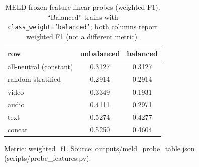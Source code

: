 \begin{table}[t]
\centering
\caption{MELD frozen-feature linear probes (weighted F1). ``Balanced'' trains with \texttt{class\_weight=`balanced'}; both columns report weighted F1 (not a different metric).}
\label{tab:meld-probe}
\begin{tabular}{lcc}
\toprule
row & unbalanced & balanced \\
\midrule
all-neutral (constant) & 0.3127 & 0.3127 \\
random-stratified & 0.2914 & 0.2914 \\
video & 0.3349 & 0.1931 \\
audio & 0.4111 & 0.2971 \\
text & 0.5274 & 0.4277 \\
concat & 0.5250 & 0.4604 \\
\bottomrule
\end{tabular}
\par\footnotesize Metric: weighted\_f1. Source: outputs/meld\_probe\_table.json (scripts/probe\_features.py).
\end{table}
